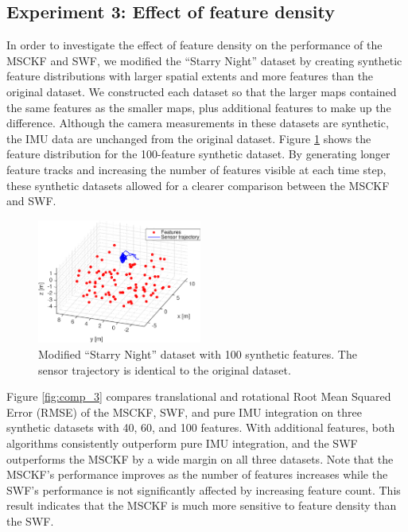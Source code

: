 \documentclass[letterpaper, 10 pt, conference]{ieeeconf}  %
\begin{document}
\subsection{Experiment 3: Effect of feature density}
In order to investigate the effect of feature density on the performance of the MSCKF and SWF, we modified the ``Starry Night'' dataset by creating synthetic feature distributions with larger spatial extents and more features than the original dataset.
We constructed each dataset so that the larger maps contained the same features as the smaller maps, plus additional features to make up the difference.
Although the camera measurements in these datasets are synthetic, the IMU data are unchanged from the original dataset.
Figure \ref{fig:trajectory_groundtruth_100lessnoisy} shows the feature distribution for the 100-feature synthetic dataset.
By generating longer feature tracks and increasing the number of features visible at each time step, these synthetic datasets allowed for a clearer comparison between the MSCKF and SWF.

\begin{figure}
    \centering
    \includegraphics[width=0.48\textwidth]{figs/trajectory_groundtruth_100lessnoisy}
    \caption{Modified ``Starry Night'' dataset with 100 synthetic features. The sensor trajectory is identical to the original dataset.}
    \label{fig:trajectory_groundtruth_100lessnoisy}
\end{figure}

Figure \ref{fig:comp_3} compares translational and rotational Root Mean Squared Error (RMSE) of the MSCKF, SWF, and pure IMU integration on three synthetic datasets with 40, 60, and 100 features.
With additional features, both algorithms consistently outperform pure IMU integration, and the SWF outperforms the MSCKF by a wide margin on all three datasets.
Note that the MSCKF's performance improves as the number of features increases while the SWF's performance is not significantly affected by increasing feature count.
This result indicates that the MSCKF is much more sensitive to feature density than the SWF.
\end{document}
